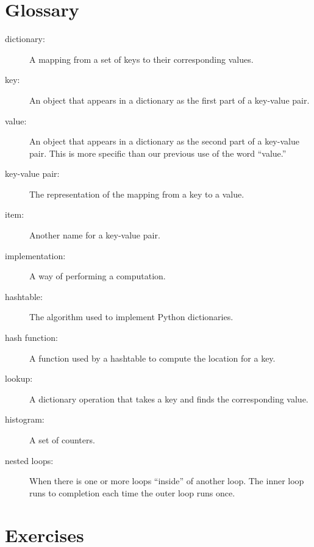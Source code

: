 \documentclass[10pt]{book}
\begin{document}
\section{Glossary}

\begin{description}

\item[dictionary:] A mapping from a set of keys to their
corresponding values.

\item[key:] An object that appears in a dictionary as the
first part of a key-value pair.

\item[value:] An object that appears in a dictionary as the
second part of a key-value pair.  This is more specific than
our previous use of the word ``value.''

\item[key-value pair:] The representation of the mapping from
a key to a value.

\item[item:] Another name for a key-value pair.

\item[implementation:] A way of performing a computation.

\item[hashtable:] The algorithm used to implement Python
dictionaries.

\item[hash function:] A function used by a hashtable to compute the
location for a key.

\item[lookup:] A dictionary operation that takes a key and finds
the corresponding value.

\item[histogram:] A set of counters.

\item[nested loops:] When there is one or more loops ``inside'' of 
another loop.  The inner loop runs to completion each time the outer
loop runs once.

\end{description}

\section{Exercises}
\end{document}
